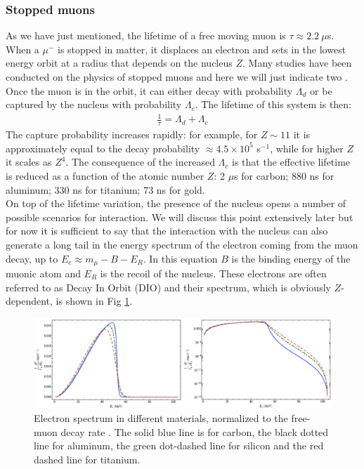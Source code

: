 \documentclass[12pt,a4paper,openright, oneside, titlepage]{book} %
\begin{document}
\subsubsection{Stopped muons}
\label{stopped_muon}
As we have just mentioned, the lifetime of a free moving muon is $\tau\approx 2.2\ \mu$s. 
When a $\mu^-$ is stopped in matter, it displaces an electron and sets in the lowest energy orbit at a radius that depends on the nucleus $Z$.
Many studies have been conducted on the physics of stopped muons  and here we will just indicate two \cite{Measday:1987}\cite{Measday:2001}. 
Once the muon is in the orbit, it can either decay with probability $\Lambda_d$ or be captured by the nucleus with probability $\Lambda_c$. 
The lifetime of this system is then:
\begin{align}
\frac{1}{\tau}=\Lambda_d + \Lambda_c \label{eq_tau}
\end{align}
The capture probability increases rapidly: for example, for $Z\sim 11$ it is approximately equal to the decay probability $\approx 4.5 \times 10^5$ s$^{-1}$, while for higher $Z$ it scales as $Z^4$.
The consequence of the increased $\Lambda_c$ is that the effective lifetime is reduced as a function of the atomic number $Z$: 2 $\mu$s for carbon; 880 ns for aluminum; 330 ns for titanium; 73 ns for gold.\\
On top of the lifetime variation, the presence of the nucleus opens a number of possible scenarios for interaction. 
We will discuss this point extensively later but for now it is sufficient to say that the interaction with the nucleus can also generate a long tail in the energy spectrum of the electron coming from the muon decay, up to $E_e\approx m_\mu -B -E_R$. 
In this equation $B$ is the binding energy of the muonic atom and $E_R$ is the recoil of the nucleus. 
These electrons are often referred to as Decay In Orbit (DIO) and their spectrum, which is obviously $Z$-dependent, is shown in Fig \ref{_DIO_pre}.\\



\begin{figure}[h!]
\centering
\includegraphics[scale=0.8]{DIO_materials}
\caption[Decay In Orbit spectra]{Electron spectrum in different materials, normalized to the free-muon decay rate \cite{Signorelli}. The solid blue line is for carbon, the black dotted line for aluminum, the green dot-dashed line for silicon and the red dashed line for titanium.}
\label{_DIO_pre}
\end{figure}
\end{document}
